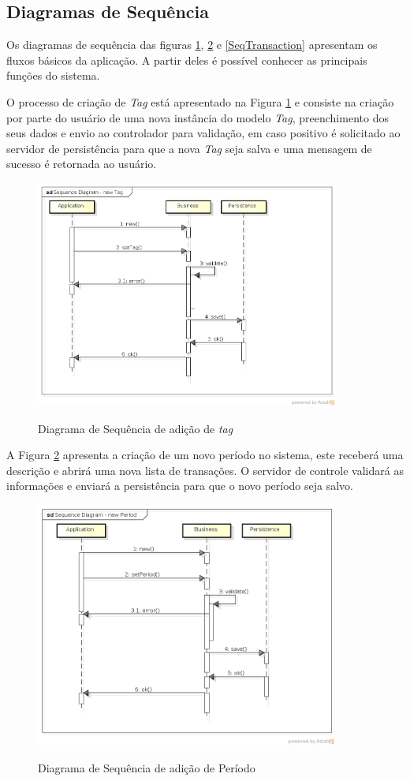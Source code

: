 \subsection{Diagramas de Sequência}
	Os diagramas de sequência das figuras \ref{SeqTag}, \ref{SeqPeriod} e \ref{SeqTransaction} apresentam os fluxos básicos da aplicação. A partir deles é possível conhecer as principais funções do sistema.
	
	O processo de criação de \textit{Tag} está apresentado na Figura \ref{SeqTag} e consiste na criação por parte do usuário de uma nova instância do modelo \textit{Tag}, preenchimento dos seus dados e envio ao controlador para validação, em caso positivo é solicitado ao servidor de persistência para que a nova \textit{Tag} seja salva e uma mensagem de sucesso é retornada ao usuário.
	
	\begin{figure}[!htb]
		\caption{Diagrama de Sequência de adição de \textit{tag}}
		{\parbox{6cm}{
				\includegraphics[width=10cm]{images/SequenceDiagramNewTag.png}
				\label{SeqTag}
		}}
	\end{figure}

	A Figura \ref{SeqPeriod} apresenta a criação de um novo período no sistema, este receberá uma descrição e abrirá uma nova lista de transações. O servidor de controle validará as informações e enviará a persistência para que o novo período seja salvo.

	\begin{figure}[!htb]
		\caption{Diagrama de Sequência de adição de Período}
		{\parbox{6cm}{
				\includegraphics[width=10cm]{images/SequenceDiagramNewPeriod.png}
				\label{SeqPeriod}
		}}
	\end{figure}

